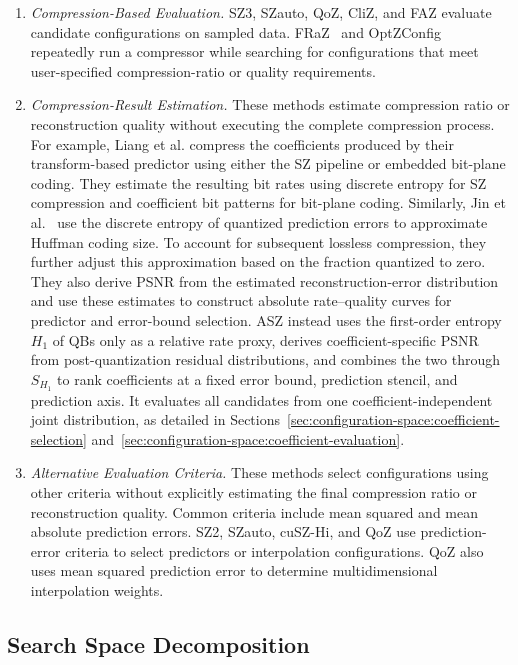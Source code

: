 \begin{enumerate}
\item \emph{Compression-Based Evaluation.} SZ3, SZauto, QoZ, CliZ, and FAZ evaluate candidate configurations on sampled data. FRaZ~\cite{underwood2020fraz} and OptZConfig~\cite{underwood2022optzconfig} repeatedly run a compressor while searching for configurations that meet user-specified compression-ratio or quality requirements.

\item \emph{Compression-Result Estimation.} These methods estimate compression ratio or reconstruction quality without executing the complete compression process. For example, Liang et al. compress the coefficients produced by their transform-based predictor using either the SZ pipeline or embedded bit-plane coding. They estimate the resulting bit rates using discrete entropy for SZ compression and coefficient bit patterns for bit-plane coding. Similarly, Jin et al.~\cite{jin2022improving} use the discrete entropy of quantized prediction errors to approximate Huffman coding size. To account for subsequent lossless compression, they further adjust this approximation based on the fraction quantized to zero. They also derive PSNR from the estimated reconstruction-error distribution and use these estimates to construct absolute rate--quality curves for predictor and error-bound selection. ASZ instead uses the first-order entropy $H_1$ of QBs only as a relative rate proxy, derives coefficient-specific PSNR from post-quantization residual distributions, and combines the two through $S_{H_1}$ to rank coefficients at a fixed error bound, prediction stencil, and prediction axis. It evaluates all candidates from one coefficient-independent joint distribution, as detailed in Sections~\ref{sec:configuration-space:coefficient-selection} and~\ref{sec:configuration-space:coefficient-evaluation}.

\item \emph{Alternative Evaluation Criteria.} These methods select configurations using other criteria without explicitly estimating the final compression ratio or reconstruction quality. Common criteria include mean squared and mean absolute prediction errors. SZ2, SZauto, cuSZ-Hi, and QoZ use prediction-error criteria to select predictors or interpolation configurations. QoZ also uses mean squared prediction error to determine multidimensional interpolation weights.
\end{enumerate}

\subsection{Search Space Decomposition}
\label{sec:related-work:search}

